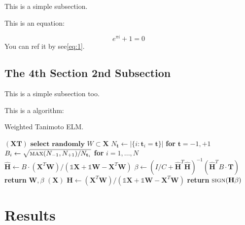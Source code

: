 \documentclass[lettersize,journal,12pt]{IEEEtran}
\begin{document}
This is a simple subsection.

This is an equation:

\begin{equation}
	\label{eq:1}
	e^{\pi i} + 1 = 0
\end{equation}
You can ref it by see\eqref{eq:1}.

\subsection{The 4th Section 2nd Subsection}

This is a simple subsection too.

This is a algorithm:

\begin{algorithm}[H]
	\caption{Weighted Tanimoto ELM.}\label{alg:alg1}
	\begin{algorithmic}
		\STATE
		$(\mathbf{X} \mathbf{T})$
		\STATE \hspace{0.5cm}$ \textbf{select randomly } W \subset \mathbf{X}  $
		\STATE \hspace{0.5cm}$ N_\mathbf{t} \gets | \{ i : \mathbf{t}_i = \mathbf{t} \} | $ \textbf{ for } $ \mathbf{t}= -1,+1 $
		\STATE \hspace{0.5cm}$ B_i \gets \sqrt{ \textsc{max}(N_{-1},N_{+1}) / N_{\mathbf{t}_i} } $ \textbf{ for } $ i = 1,...,N $
		\STATE \hspace{0.5cm}$ \hat{\mathbf{H}} \gets  B \cdot (\mathbf{X}^T\textbf{W})/( \mathbb{1}\mathbf{X} + \mathbb{1}\textbf{W} - \mathbf{X}^T\textbf{W} ) $
		\STATE \hspace{0.5cm}$ \beta \gets \left ( I/C + \hat{\mathbf{H}}^T\hat{\mathbf{H}} \right )^{-1}(\hat{\mathbf{H}}^T B\cdot \mathbf{T})  $
		\STATE \hspace{0.5cm}\textbf{return}  $\textbf{W},  \beta $
		\STATE
		$(\mathbf{X} )$
		\STATE \hspace{0.5cm}$ \mathbf{H} \gets  (\mathbf{X}^T\textbf{W} )/( \mathbb{1}\mathbf{X}  + \mathbb{1}\textbf{W}- \mathbf{X}^T\textbf{W}  ) $
		\STATE \hspace{0.5cm}\textbf{return}  $\textsc{sign}( \mathbf{H} \beta )$
	\end{algorithmic}
	\label{alg1}
\end{algorithm}

\section{Results}
\end{document}
